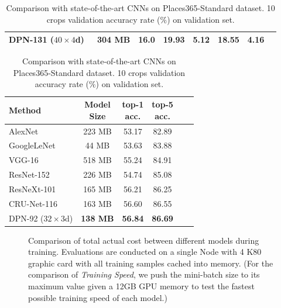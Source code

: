 \documentclass{article}
\begin{document}
\begin{table}[t]
{\begin{tabular}{lccccccc}
	DPN-131 ($40\times4$d)~\textdagger    & \textbf{304 MB}      & \textbf{16.0} & \textbf{19.93} & \textbf{5.12} & \textbf{18.55} & \textbf{4.16} \\
	\hline
  \end{tabular}
}
\hskip 0.1in
\parbox{.40\linewidth}{
\centering
  \caption{Comparison with state-of-the-art CNNs on Places365-Standard dataset. 10 crops validation accuracy rate ($\%$) on validation set.}
  \vskip -0.08in	
  \scriptsize
  \label{tab_places}
  \begin{tabular}{lccccc}
	\hline
	Method    							& \makecell[c]{ Model\\Size} & \makecell[c]{top-1 \\ acc.} & \makecell[c]{top-5 \\ acc.} \\
	\hline
	AlexNet~\citep{zhou2016places}	 	&  223 MB	  & 53.17    &   82.89    \\
	GoogleLeNet~\citep{zhou2016places} 	&   44 MB	  & 53.63    &   83.88    \\
	VGG-16~\citep{zhou2016places}		&  518 MB	  & 55.24    &   84.91    \\
	ResNet-152~\citep{zhou2016places}	&  226 MB	  & 54.74    &   85.08    \\
	\hline
	ResNeXt-101~\citep{ypChen2017}		&  165 MB	  & 56.21    &   86.25    \\
	CRU-Net-116~\citep{ypChen2017}		&  163 MB 	  & 56.60    &   86.55    \\
	DPN-92  ($32\times3$d)		   & \textbf{138 MB}  & \textbf{56.84}  & \textbf{86.69}    \\
	\hline
  \end{tabular}
}
\vskip -0.1in
\end{table}

\begin{figure}[t]	
	\center
	\vskip -0.1in
	\caption{Comparison of total actual cost between different models during training. Evaluations are conducted on a single Node with 4 K80 graphic card with all training samples cached into memory. (For the comparison of \emph{Training Speed}, we push the mini-batch size to its maximum value given a 12GB GPU memory to test the fastest possible training speed of each model.)}
	\label{fig_dot}
	\vskip -0.15in
\end{figure}
\end{document}
